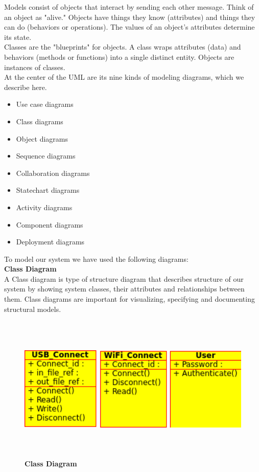 \hspace*{0.82cm}Models consist of objects that interact by sending each other message. Think of an
object as "alive." Objects have things they know (attributes) and things they can do
(behaviors or operations). The values of an object's attributes determine its state.\\[0.5cm]
\hspace*{0.82cm}Classes are the "blueprints" for objects. A class wraps attributes (data) and behaviors
(methods or functions) into a single distinct entity. Objects are instances of classes.\\[0.5cm]
At the center of the UML are its nine kinds of modeling diagrams, which we describe here.
\begin{itemize}
 \item Use case diagrams
 \item Class diagrams
 \item Object diagrams
 \item Sequence diagrams
 \item Collaboration diagrams
 \item Statechart diagrams
 \item Activity diagrams
 \item Component diagrams
 \item Deployment diagrams
\end{itemize}
To model our system we have used the following diagrams:\\[0.5cm]
\textbf{Class Diagram}\\
\hspace*{0.82cm}A Class diagram is type of structure diagram that describes
structure of our system by showing system classes, their attributes and relationships between
them. Class diagrams are important for visualizing, specifying and documenting structural
models.\\[1cm]
\begin{figure}[H]
  \centering
    \includegraphics[height=7cm, width=12cm]{project/images/class-diagram}
  \caption{\textbf{Class Diagram}}
\end{figure}
